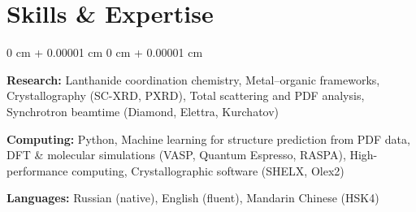 \documentclass[10pt, letterpaper]{article}
\newenvironment{onecolentry}{
    \begin{adjustwidth}{
        0 cm + 0.00001 cm
    }{
        0 cm + 0.00001 cm
    }
}{
    \end{adjustwidth}
} %
\begin{document}
    \section{Skills \& Expertise}
    \vspace{0.04 cm}
    \begin{onecolentry}
    \textbf{Research:} Lanthanide coordination chemistry, Metal–organic frameworks,
    Crystallography (SC-XRD, PXRD), Total scattering and PDF analysis,
    Synchrotron beamtime (Diamond, Elettra, Kurchatov)

    \vspace{0.06cm}
    \textbf{Computing:} Python, Machine learning for structure prediction from PDF data, DFT \& molecular simulations (VASP, Quantum Espresso, RASPA), High-performance computing, Crystallographic software (SHELX, Olex2)

    \vspace{0.06cm}
    \textbf{Languages:} Russian (native), English (fluent), Mandarin Chinese (HSK4)
    \end{onecolentry}
\end{document}

